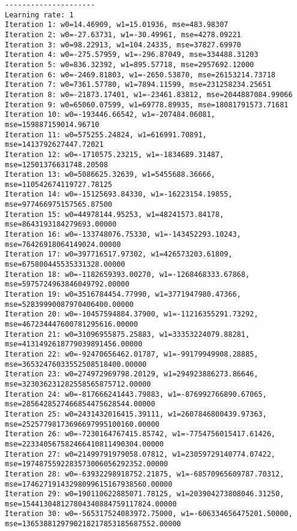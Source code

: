 \documentclass[11pt]{article}
\begin{document}
    \begin{Verbatim}[commandchars=\\\{\}]
---------------------
Learning rate: 1
Iteration 1: w0=14.46909, w1=15.01936, mse=483.98307
Iteration 2: w0=-27.63731, w1=-30.49961, mse=4278.09221
Iteration 3: w0=98.22913, w1=104.24335, mse=37827.69970
Iteration 4: w0=-275.57959, w1=-296.87049, mse=334488.31203
Iteration 5: w0=836.32392, w1=895.57718, mse=2957692.12000
Iteration 6: w0=-2469.81803, w1=-2650.53870, mse=26153214.73718
Iteration 7: w0=7361.57780, w1=7894.11599, mse=231258234.25651
Iteration 8: w0=-21873.17401, w1=-23461.83812, mse=2044887084.99066
Iteration 9: w0=65060.07599, w1=69778.89935, mse=18081791573.71681
Iteration 10: w0=-193446.66542, w1=-207484.06081, mse=159887159014.96710
Iteration 11: w0=575255.24824, w1=616991.70891, mse=1413792627447.72021
Iteration 12: w0=-1710575.23215, w1=-1834689.31487, mse=12501376631748.20508
Iteration 13: w0=5086625.32639, w1=5455688.36666, mse=110542674119727.78125
Iteration 14: w0=-15125693.84330, w1=-16223154.19855, mse=977466975157565.87500
Iteration 15: w0=44978144.95253, w1=48241573.84178, mse=8643193184279693.00000
Iteration 16: w0=-133748076.75330, w1=-143452293.10243, mse=76426918064149024.00000
Iteration 17: w0=397716517.97302, w1=426573203.61809, mse=675800445535331328.00000
Iteration 18: w0=-1182659393.00270, w1=-1268468333.67868, mse=5975724963846049792.00000
Iteration 19: w0=3516784454.77990, w1=3771947980.47366, mse=52839990087970406400.00000
Iteration 20: w0=-10457594884.37900, w1=-11216355291.73292, mse=467234447600781295616.00000
Iteration 21: w0=31096955875.25883, w1=33353224079.88281, mse=4131492618779039891456.00000
Iteration 22: w0=-92470656462.01787, w1=-99179949908.28885, mse=36532476033552508518400.00000
Iteration 23: w0=274972969798.20129, w1=294923886273.86646, mse=323036231282558565875712.00000
Iteration 24: w0=-817666241443.79883, w1=-876992766890.67065, mse=2856428527466854475628544.00000
Iteration 25: w0=2431432016415.39111, w1=2607846800439.97363, mse=25257798173696697995100160.00000
Iteration 26: w0=-7230164767415.85742, w1=-7754756015417.61426, mse=223340567582466410811490304.00000
Iteration 27: w0=21499791979058.07812, w1=23059729140774.07422, mse=1974875592283573006056292352.00000
Iteration 28: w0=-63932298918752.21875, w1=-68570965609787.70312, mse=17462719143298099615167938560.00000
Iteration 29: w0=190110622885071.78125, w1=203904273808046.31250, mse=154413048127804340884759117824.00000
Iteration 30: w0=-565317524083972.75000, w1=-606334656475201.50000, mse=1365388129790218217853185687552.00000

\end{Verbatim}
\end{document}
